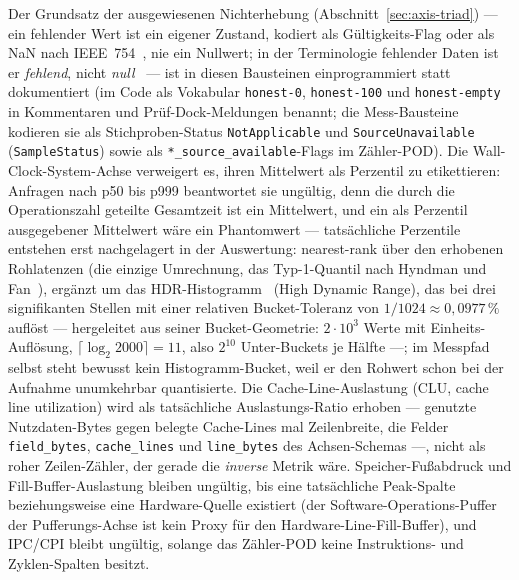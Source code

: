 \begin{nurlang}
Der Grundsatz der ausgewiesenen Nichterhebung (Abschnitt~\ref{sec:axis-triad}) --- ein fehlender Wert ist
ein eigener Zustand, kodiert als Gültigkeits-Flag oder als NaN nach IEEE~754~\cite{ieee754_2019}, nie ein
Nullwert; in der Terminologie fehlender Daten ist er \emph{fehlend}, nicht
\emph{null}~\cite{rubin1976missing} --- ist in diesen Bausteinen einprogrammiert statt dokumentiert
(im Code als Vokabular \texttt{honest-0}, \texttt{honest-100} und \texttt{honest-empty} in Kommentaren
und Prüf-Dock-Meldungen benannt; die Mess-Bausteine kodieren sie als Stichproben-Status
\texttt{NotApplicable} und \texttt{SourceUnavailable} (\texttt{SampleStatus}) sowie als
\texttt{*\_source\_available}-Flags im Zähler-POD). Die Wall-Clock-System-Achse verweigert es, ihren
Mittelwert als
Perzentil zu etikettieren: Anfragen nach p50 bis p999 beantwortet sie ungültig, denn die durch die
Operationszahl geteilte Gesamtzeit ist ein Mittelwert, und ein als Perzentil ausgegebener Mittelwert wäre
ein Phantomwert --- tatsächliche Perzentile entstehen erst nachgelagert in der Auswertung: nearest-rank über den
erhobenen Rohlatenzen (die einzige Umrechnung, das Typ-1-Quantil nach Hyndman und
Fan~\cite{hyndman1996quantiles}), ergänzt um das HDR-Histogramm~\cite{tene_hdrhistogram} (High Dynamic
Range), das bei drei signifikanten Stellen mit einer relativen Bucket-Toleranz von
$1/1024 \approx 0{,}0977\,\%$ auflöst --- hergeleitet aus seiner Bucket-Geometrie: $2\cdot10^{3}$ Werte mit
Einheits-Auflösung, $\lceil\log_2 2000\rceil = 11$, also $2^{10}$ Unter-Buckets je Hälfte ---; im Messpfad
selbst steht bewusst kein Histogramm-Bucket, weil er den Rohwert schon bei der Aufnahme unumkehrbar
quantisierte. Die Cache-Line-Auslastung (CLU, cache line utilization) wird als tatsächliche Auslastungs-Ratio
erhoben --- genutzte Nutzdaten-Bytes gegen belegte Cache-Lines mal Zeilenbreite, die Felder
\texttt{field\_bytes}, \texttt{cache\_lines} und \texttt{line\_bytes} des Achsen-Schemas ---, nicht als
roher Zeilen-Zähler, der gerade die \emph{inverse} Metrik wäre. Speicher-Fußabdruck und
Fill-Buffer-Auslastung bleiben ungültig, bis eine tatsächliche Peak-Spalte beziehungsweise eine Hardware-Quelle
existiert (der Software-Operations-Puffer der Pufferungs-Achse ist kein Proxy für den
Hardware-Line-Fill-Buffer), und IPC/CPI bleibt ungültig, solange das Zähler-POD keine Instruktions- und
Zyklen-Spalten besitzt.
\end{nurlang}

